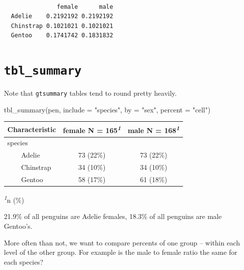 \documentclass[
  letterpaper,
  DIV=11,
  numbers=noendperiod,
  oneside]{scrreprt}
\newenvironment{Shaded}{\begin{snugshade}}{\end{snugshade}}
\newcommand{\AttributeTok}[1]{\textcolor[rgb]{0.40,0.45,0.13}{#1}}
\newcommand{\FunctionTok}[1]{\textcolor[rgb]{0.28,0.35,0.67}{#1}}
\newcommand{\NormalTok}[1]{\textcolor[rgb]{0.00,0.23,0.31}{#1}}
\newcommand{\StringTok}[1]{\textcolor[rgb]{0.13,0.47,0.30}{#1}}
\begin{document}
\begin{verbatim}
           
               female      male
  Adelie    0.2192192 0.2192192
  Chinstrap 0.1021021 0.1021021
  Gentoo    0.1741742 0.1831832
\end{verbatim}

\section{\texorpdfstring{\texttt{tbl\_summary}}{tbl\_summary}}

Note that \texttt{gtsummary} tables tend to round pretty heavily.

\begin{Shaded}
\begin{Highlighting}[]
\FunctionTok{tbl\_summary}\NormalTok{(pen, }\AttributeTok{include =} \StringTok{"species"}\NormalTok{, }\AttributeTok{by =} \StringTok{"sex"}\NormalTok{, }\AttributeTok{percent =} \StringTok{"cell"}\NormalTok{)}
\end{Highlighting}
\end{Shaded}

\begin{table}
\fontsize{12.0pt}{14.4pt}\selectfont
\begin{tabular*}{\linewidth}{@{\extracolsep{\fill}}lcc}
\toprule
\textbf{Characteristic} & \textbf{female}  N = 165\textsuperscript{\textit{1}} & \textbf{male}  N = 168\textsuperscript{\textit{1}} \\ 
\midrule\addlinespace[2.5pt]
species &  &  \\ 
    Adelie & 73 (22\%) & 73 (22\%) \\ 
    Chinstrap & 34 (10\%) & 34 (10\%) \\ 
    Gentoo & 58 (17\%) & 61 (18\%) \\ 
\bottomrule
\end{tabular*}
\begin{minipage}{\linewidth}
\textsuperscript{\textit{1}}n (\%)\\
\end{minipage}
\end{table}

21.9\% of all penguins are Adelie females, 18.3\% of all penguins are
male Gentoo's.

\begin{tcolorbox}[enhanced jigsaw, bottomrule=.15mm, colback=white, colframe=quarto-callout-note-color-frame, toprule=.15mm, coltitle=black, rightrule=.15mm, opacitybacktitle=0.6, colbacktitle=quarto-callout-note-color!10!white, toptitle=1mm, leftrule=.75mm, breakable, bottomtitle=1mm, titlerule=0mm, title=\textcolor{quarto-callout-note-color}{\faInfo}\hspace{0.5em}{Comparing percentages}, arc=.35mm, left=2mm, opacityback=0]

More often than not, we want to compare percents of one group -- within
each level of the other group. For example is the male to female ratio
the same for each species?

\end{tcolorbox}
\end{document}

